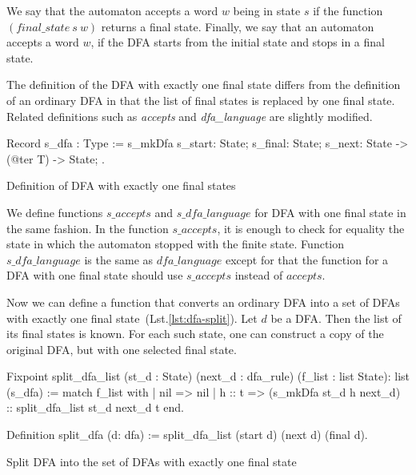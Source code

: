We say that the automaton accepts a word $w$ being in state $s$ if the function $(\textit{final\_state} \ s \ w)$ returns a final state.
Finally, we say that an automaton accepts a word $w$, if the DFA starts from the initial state and stops in a final state.



The definition of the  DFA with exactly one final state differs from the definition of an ordinary DFA in that the list of final states is replaced by one final state. 
Related definitions such as \textit{accepts} and \textit{dfa\_language} are slightly modified.

\begin{listing}[h]
    \begin{pyglist}[language=coq, numbers=none, numbersep=5pt]
  Record s_dfa : Type :=
    s_mkDfa {
      s_start: State;
      s_final: State;
      s_next: State -> (@ter T) -> State;
  }.      
    \end{pyglist}
    \caption{Definition of DFA with exactly one final states}
    \label{lst:dfa-one-ss}
\end{listing}
  
We define functions $\textit{s\_accepts}$ and $\textit{s\_dfa\_language}$ for DFA with one final state in the same fashion.
In the function $\textit{s\_accepts}$, it is enough to check for equality the state in which the automaton stopped with the finite state. Function $\textit{s\_dfa\_language}$ is the same as  $\textit{dfa\_language}$ except for that the function for a DFA with one final state should use $\textit{s\_accepts}$ instead of $\textit{accepts}$.



Now we can define a function that converts an ordinary DFA into a set of DFAs with exactly one final state~(Lst.\ref{lst:dfa-split}).
Let $d$ be a DFA. Then the list of its final states is known. 
For each such state, one can construct a copy of the original DFA, but with one selected final state.

\begin{listing}[h]
    \begin{pyglist}[language=coq, numbers=none, numbersep=5pt]
  Fixpoint split_dfa_list 
      (st_d : State) 
      (next_d : dfa_rule) 
      (f_list : list State): list (s_dfa) :=
    match f_list with
    | nil => nil
    | h :: t => (s_mkDfa st_d h next_d) 
                :: split_dfa_list st_d next_d t
    end.    
 
 Definition split_dfa (d: dfa) := 
   split_dfa_list (start d) (next d) (final d).
    \end{pyglist}
    \caption{Split DFA into the set of DFAs with exactly one final state}
    \label{lst:dfa-split}
\end{listing}



